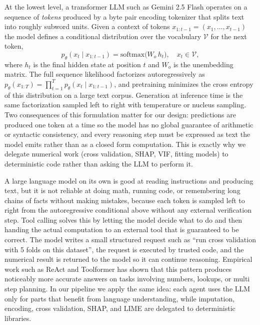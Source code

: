 \documentclass{article}
\begin{document}
At the lowest level, a transformer LLM such as Gemini 2.5 Flash operates on a
sequence of \emph{tokens} produced by a byte pair encoding tokenizer that
splits text into roughly subword units. Given a context of tokens
$x_{1:t-1} = (x_1, \dots, x_{t-1})$ the model defines a conditional
distribution over the vocabulary $\mathcal{V}$ for the next token,
\begin{equation}
p_\theta(x_t \mid x_{1:t-1}) = \mathrm{softmax}\!\big(W_o\, h_t\big),
\quad x_t \in \mathcal{V},
\end{equation}
where $h_t$ is the final hidden state at position $t$ and $W_o$ is the
unembedding matrix. The full sequence likelihood factorizes
autoregressively as $p_\theta(x_{1:T}) = \prod_{t=1}^{T} p_\theta(x_t \mid x_{1:t-1})$,
and pretraining minimizes the cross entropy of this distribution on a large
text corpus. Generation at inference time is the same factorization sampled
left to right with temperature or nucleus sampling. Two consequences of this
formulation matter for our design: predictions are produced one token at a
time so the model has no global guarantee of arithmetic or syntactic
consistency, and every reasoning step must be expressed as text the model
emits rather than as a closed form computation. This is exactly why we
delegate numerical work (cross validation, SHAP, VIF, fitting models) to
deterministic code rather than asking the LLM to perform it.

A large language model on its own is good at reading instructions and producing
text, but it is not reliable at doing math, running code, or remembering long
chains of facts without making mistakes, because each token is sampled
left to right from the autoregressive conditional above without any external
verification step. Tool calling
solves this by letting the model decide what to do and then handing the actual
computation to an external tool that is guaranteed to be correct. The model writes a small
structured request such as ``run cross validation with 5 folds on this dataset'',
the request is executed by trusted code, and the numerical result is returned
to the model so it can continue reasoning. Empirical work such as ReAct
\citep{yao2023react} and Toolformer \citep{schick2023toolformer} has shown
that this pattern produces noticeably more accurate answers on tasks
involving numbers, lookups, or multi step planning. In our pipeline we
apply the same idea: each agent uses the LLM only for parts that benefit
from language understanding, while imputation, encoding, cross validation,
SHAP, and LIME are delegated to deterministic libraries.
\end{document}
